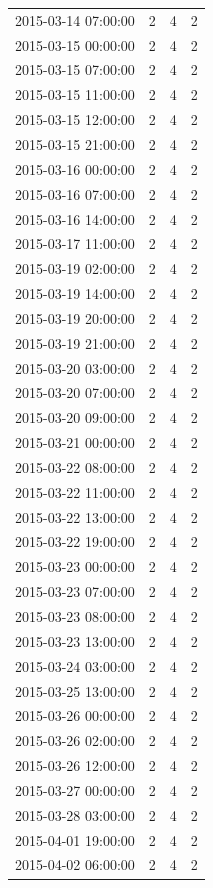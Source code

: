 \begin{tabular}{lrrr}
2015-03-14 07:00:00 & 2 & 4 & 2 \\
2015-03-15 00:00:00 & 2 & 4 & 2 \\
2015-03-15 07:00:00 & 2 & 4 & 2 \\
2015-03-15 11:00:00 & 2 & 4 & 2 \\
2015-03-15 12:00:00 & 2 & 4 & 2 \\
2015-03-15 21:00:00 & 2 & 4 & 2 \\
2015-03-16 00:00:00 & 2 & 4 & 2 \\
2015-03-16 07:00:00 & 2 & 4 & 2 \\
2015-03-16 14:00:00 & 2 & 4 & 2 \\
2015-03-17 11:00:00 & 2 & 4 & 2 \\
2015-03-19 02:00:00 & 2 & 4 & 2 \\
2015-03-19 14:00:00 & 2 & 4 & 2 \\
2015-03-19 20:00:00 & 2 & 4 & 2 \\
2015-03-19 21:00:00 & 2 & 4 & 2 \\
2015-03-20 03:00:00 & 2 & 4 & 2 \\
2015-03-20 07:00:00 & 2 & 4 & 2 \\
2015-03-20 09:00:00 & 2 & 4 & 2 \\
2015-03-21 00:00:00 & 2 & 4 & 2 \\
2015-03-22 08:00:00 & 2 & 4 & 2 \\
2015-03-22 11:00:00 & 2 & 4 & 2 \\
2015-03-22 13:00:00 & 2 & 4 & 2 \\
2015-03-22 19:00:00 & 2 & 4 & 2 \\
2015-03-23 00:00:00 & 2 & 4 & 2 \\
2015-03-23 07:00:00 & 2 & 4 & 2 \\
2015-03-23 08:00:00 & 2 & 4 & 2 \\
2015-03-23 13:00:00 & 2 & 4 & 2 \\
2015-03-24 03:00:00 & 2 & 4 & 2 \\
2015-03-25 13:00:00 & 2 & 4 & 2 \\
2015-03-26 00:00:00 & 2 & 4 & 2 \\
2015-03-26 02:00:00 & 2 & 4 & 2 \\
2015-03-26 12:00:00 & 2 & 4 & 2 \\
2015-03-27 00:00:00 & 2 & 4 & 2 \\
2015-03-28 03:00:00 & 2 & 4 & 2 \\
2015-04-01 19:00:00 & 2 & 4 & 2 \\
2015-04-02 06:00:00 & 2 & 4 & 2 \\

\end{tabular}
